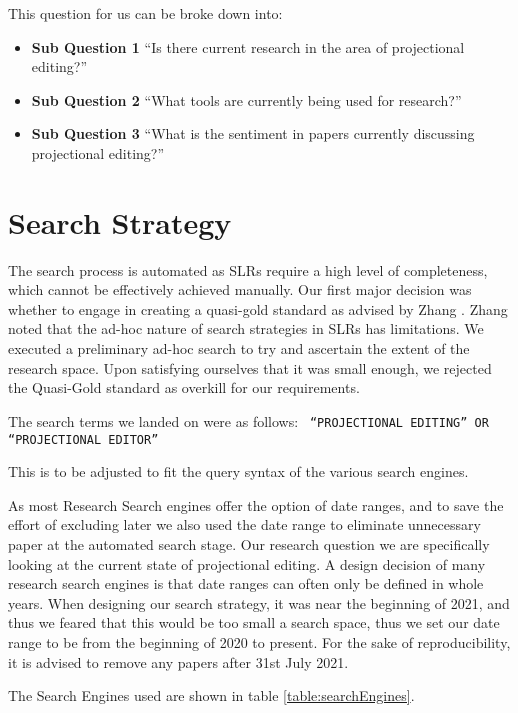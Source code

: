 This question for us can be broke down into:
\begin{itemize}
    \item \textbf{Sub Question 1} ``Is there current research in the area of projectional editing?''
    \item \textbf{Sub Question 2} ``What tools are currently being used for research?''
    \item \textbf{Sub Question 3} ``What is the sentiment in papers currently discussing projectional editing?''
\end{itemize}


\section{Search Strategy}

The search process is automated as SLRs require a high level of completeness, which cannot be effectively achieved manually.
Our first major decision was whether to engage in creating a quasi-gold standard as advised by Zhang \cite{Zhang_2011}. 
Zhang noted that the ad-hoc nature of search strategies in SLRs has limitations. 
We executed a preliminary ad-hoc search to try and ascertain the extent of the research space.
Upon satisfying ourselves that it was small enough, we rejected the Quasi-Gold standard as overkill for our requirements.

The search terms we landed on were as follows:
{\obeylines\obeyspaces
\texttt{
    ``PROJECTIONAL EDITING'' 
       OR 
    ``PROJECTIONAL EDITOR'' 
}}

This is to be adjusted to fit the query syntax of the various search engines.

As most Research Search engines offer the option of date ranges, and to save the effort of excluding later we also used the date range to eliminate unnecessary paper at the automated search stage.
Our research question we are specifically looking at the current state of projectional editing.
A design decision of many research search engines is that date ranges can often only be defined in whole years.
When designing our search strategy, it was near the beginning of 2021, and thus we feared that this would be too small a search space, thus we set our date range to be from the beginning of 2020 to present.
For the sake of reproducibility, it is advised to remove any papers after 31st July 2021.

The Search Engines used are shown in table \ref{table:searchEngines}.

